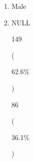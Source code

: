 \documentclass[]{article}
\providecommand{\tightlist}{%
  \setlength{\itemsep}{0pt}\setlength{\parskip}{0pt}}
\begin{document}
\begin{enumerate}
  84

  (

  35.3\%

  )

  1

  (

  0.4\%

  )

  146

  (

  61.3\%

  )

  1

  (

  0.4\%

  )

  2

  (

  0.8\%

  )

  3

  (

  1.3\%

  )

  1

  (

  0.4\%

  )

  0 (0.0\%)

  3

  Age\_Participant {[}integer{]}

  Mean (sd) : 41.2 (9.1) min \textless{} med \textless{} max: 23
  \textless{} 39 \textless{} 74 IQR (CV) : 11.5 (0.2)

  43 distinct values

  3 (1.3\%)

  4

  Gender\_Participant {[}character{]}

  \begin{enumerate}
  \def\labelenumii{\arabic{enumii}.}
  \tightlist
  \item
    Female
  \end{enumerate}
\item
  Male
\item
  NULL

  149

  (

  62.6\%

  )

  86

  (

  36.1\%

  )


\end{enumerate}
\end{document}
